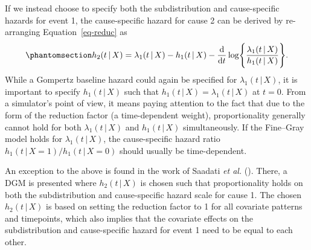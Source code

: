 \documentclass[
  letterpaper,
  DIV=11,
  numbers=noendperiod]{scrreprt}
\newcommand{\given}{\,|\,}
\newcommand\diff{\mathop{}\!\mathrm{d}}
\begin{document}
If we instead choose to specify both the subdistribution and
cause-specific hazards for event 1, the cause-specific hazard for cause
2 can be derived by re-arranging Equation~\ref{eq-reduc} as
\begin{equation}\phantomsection\label{eq-sdh1-csh1}{
h_2(t \given X) = \lambda_1(t \given X) - h_1(t \given X) - \frac{\diff}{\diff t} \log \Biggl\{ \frac{\lambda_1(t \given X)}{h_1(t \given X)}\Biggr\}.
}\end{equation} While a Gompertz baseline hazard could again be
specified for \(\lambda_1(t \given X)\), it is important to specify
\(h_1(t \given X)\) such that
\(h_1(t \given X) = \lambda_1(t \given X)\) at \(t = 0\). From a
simulator's point of view, it means paying attention to the fact that
due to the form of the reduction factor (a time-dependent weight),
proportionality generally cannot hold for both \(\lambda_1(t \given X)\)
and \(h_1(t \given X)\) simultaneously. If the Fine--Gray model holds
for \(\lambda_1(t \given X)\), the cause-specific hazard ratio
\(h_1(t \given X=1) / h_1(t \given X=0)\) should usually be
time-dependent.

An exception to the above is found in the work of Saadati \emph{et al.}
(). There, a
DGM is presented where \(h_2(t \given X)\) is chosen such that
proportionality holds on both the subdistribution and cause-specific
hazard scale for cause 1. The chosen \(h_2(t \given X)\) is based on
setting the reduction factor to 1 for all covariate patterns and
timepoints, which also implies that the covariate effects on the
subdistribution and cause-specific hazard for event 1 need to be equal
to each other.
\end{document}
